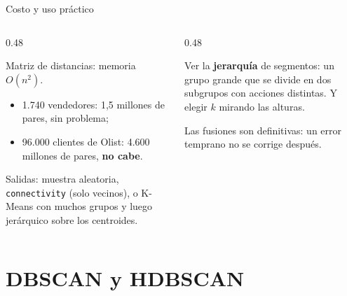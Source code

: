 \documentclass[aspectratio=169,12pt]{beamer}
\begin{document}
\begin{frame}{Costo y uso práctico}
  \begin{columns}[T]
    \begin{column}{0.48\textwidth}
      \begin{goldbox}[Costo]
        \small Matriz de distancias: memoria $O(n^2)$.
        \begin{itemize}
          \item 1.740 vendedores: 1,5 millones de pares, sin problema;
          \item 96.000 clientes de Olist: 4.600 millones de pares, \textbf{no cabe}.
        \end{itemize}
      \end{goldbox}
      \small Salidas: muestra aleatoria, \texttt{connectivity} (solo vecinos), o K-Means con muchos grupos y luego jerárquico sobre los centroides.
    \end{column}
    \begin{column}{0.48\textwidth}
      \begin{keybox}
        \small Ver la \textbf{jerarquía} de segmentos: un grupo grande que se divide en dos subgrupos con acciones distintas. Y elegir $k$ mirando las alturas.
      \end{keybox}
      \begin{rulebox}
        \small Las fusiones son definitivas: un error temprano no se corrige después.
      \end{rulebox}
    \end{column}
  \end{columns}
\end{frame}

\section{DBSCAN y HDBSCAN}
\end{document}
